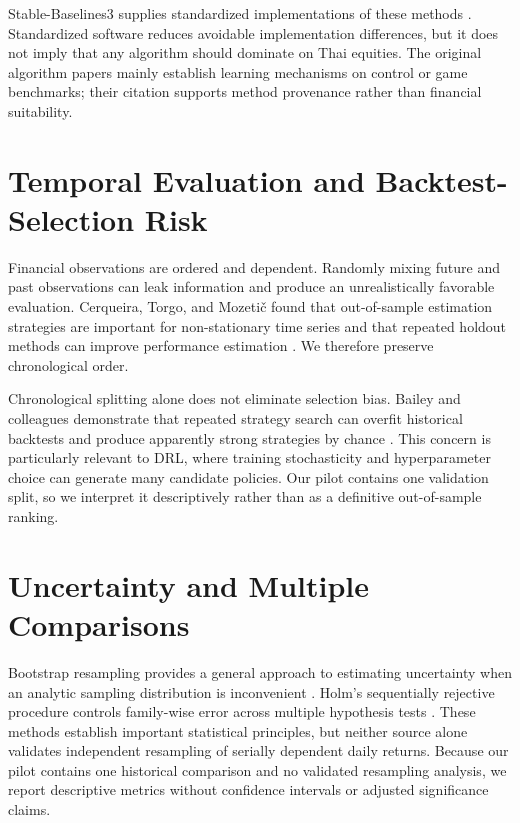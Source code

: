 \documentclass[12pt,a4paper,oneside]{book}
\theoremstyle{plain}
\numberwithin{equation}{chapter} \DeclareMathOperator{\Var}{Var}
\begin{document}
Stable-Baselines3 supplies standardized implementations of these methods \cite{raffin2021sb3}. Standardized software reduces avoidable implementation differences, but it does not imply that any algorithm should dominate on Thai equities. The original algorithm papers mainly establish learning mechanisms on control or game benchmarks; their citation supports method provenance rather than financial suitability.

\section{Temporal Evaluation and Backtest-Selection Risk}

Financial observations are ordered and dependent. Randomly mixing future and past observations can leak information and produce an unrealistically favorable evaluation. Cerqueira, Torgo, and Mozeti\v{c} found that out-of-sample estimation strategies are important for non-stationary time series and that repeated holdout methods can improve performance estimation \cite{cerqueira2020timeseries}. We therefore preserve chronological order.

Chronological splitting alone does not eliminate selection bias. Bailey and colleagues demonstrate that repeated strategy search can overfit historical backtests and produce apparently strong strategies by chance \cite{bailey2017backtest}. This concern is particularly relevant to DRL, where training stochasticity and hyperparameter choice can generate many candidate policies. Our pilot contains one validation split, so we interpret it descriptively rather than as a definitive out-of-sample ranking.

\section{Uncertainty and Multiple Comparisons}

Bootstrap resampling provides a general approach to estimating uncertainty when an analytic sampling distribution is inconvenient \cite{efron1979bootstrap}. Holm's sequentially rejective procedure controls family-wise error across multiple hypothesis tests \cite{holm1979}. These methods establish important statistical principles, but neither source alone validates independent resampling of serially dependent daily returns. Because our pilot contains one historical comparison and no validated resampling analysis, we report descriptive metrics without confidence intervals or adjusted significance claims.
\end{document}
